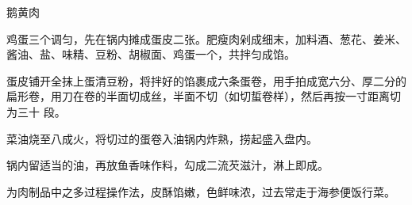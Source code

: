 \begin{recipe}{鹅黄肉}

\ingredients


\preparation

\step 鸡蛋三个调匀，先在锅内摊成蛋皮二张。肥瘦肉剁成细末，加料酒、葱花、姜米、
酱油、盐、味精、豆粉、胡椒面、鸡蛋一个，共拌匀成馅。

\step 蛋皮铺开全抹上蛋清豆粉，将拌好的馅裹成六条蛋卷，用手拍成宽六分、厚二分的
扁形卷，用刀在卷的半面切成丝，半面不切（如切蜇卷样），然后再按一寸距离切为三十
段。

\step 菜油烧至八成火，将切过的蛋卷入油锅内炸熟，捞起盛入盘内。

\step 锅内留适当的油，再放鱼香味作料，勾成二流芡滋汁，淋上即成。

\features

为肉制品中之多过程操作法，皮酥馅嫩，色鲜味浓，过去常走于海参便饭行菜。

\end{recipe}

